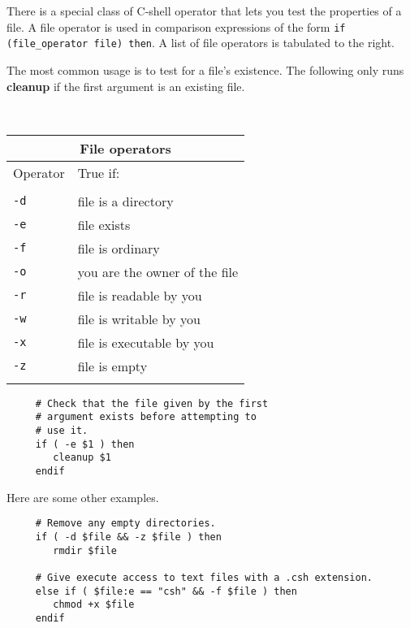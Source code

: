 \documentclass[twoside,11pt]{article}
\newcommand{\latexelsehtml}[2]{#1}
\newcommand{\latexelsehtml}[2]{#2}
\begin{document}
\begin{minipage}{62mm}
There is a special class of C-shell operator that lets you test the
properties of a file.  A {\sf file operator} is used in comparison
expressions of the form \mbox{\tt if (file\_operator file) then}.
A list of file operators is tabulated \latexelsehtml{to the right}{below}.
\medskip

The most common usage is to test for a file's existence.  The following
only runs {\bf cleanup} if the first argument is an existing file.

\vspace*{9mm}
\end{minipage}
\ \hfill \
\begin{minipage}{74mm}
\vspace*{-16mm}
\begin{tabular}{ll}
\hline
\multicolumn{2}{c}{File operators} \\ \hline
Operator & True if: \\ \hline
\\
{\tt -d} & file is a directory \\
{\tt -e} & file exists \\
{\tt -f} & file is ordinary \\
{\tt -o} & you are the owner of the file \\
{\tt -r} & file is readable by you \\
{\tt -w} & file is writable by you \\
{\tt -x} & file is executable by you \\
{\tt -z} & file is empty \\
\\ \hline
\end{tabular}
\end{minipage}
\vspace*{-8mm}

\small
\begin{verbatim}
     # Check that the file given by the first
     # argument exists before attempting to
     # use it.
     if ( -e $1 ) then
        cleanup $1
     endif
\end{verbatim}
\normalsize

Here are some other examples.

\small
\begin{verbatim}
     # Remove any empty directories.
     if ( -d $file && -z $file ) then
        rmdir $file

     # Give execute access to text files with a .csh extension.
     else if ( $file:e == "csh" && -f $file ) then
        chmod +x $file
     endif
\end{verbatim}
\end{document}
